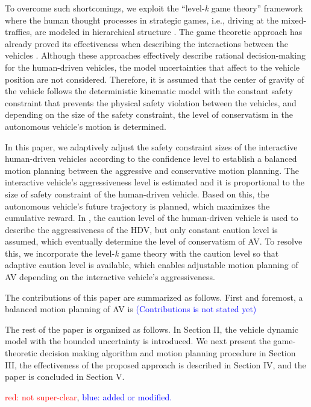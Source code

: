 \documentclass[10pt,journal]{IEEEtran}
\begin{document}
	To overcome such shortcomings, we exploit the ``level-\textit{k} game theory'' framework where the human thought processes in strategic games, i.e., driving at the mixed-traffics, are modeled in hierarchical structure \cite{Stahl1993}. The game theoretic approach has already proved its effectiveness when describing the interactions between the vehicles \cite{Li2017, Li2018, Tian2018}. Although these approaches effectively describe rational decision-making for the human-driven vehicles, the model uncertainties that affect to the vehicle position are not considered. Therefore, it is assumed that the center of gravity of the vehicle follows the deterministic kinematic model with the constant safety constraint that prevents the physical safety violation between the vehicles, and depending on the size of the safety constraint, the level of conservatism in the autonomous vehicle's motion is determined. 
	
	In this paper, we adaptively adjust the safety constraint sizes of the interactive human-driven vehicles according to the confidence level to establish a balanced motion planning between the aggressive and conservative motion planning. The interactive vehicle's aggressiveness level is estimated and it is proportional to the size of safety constraint of the human-driven vehicle. Based on this, the autonomous vehicle's future trajectory is planned, which maximizes the cumulative reward. In \cite{Jin2019}, the caution level of the human-driven vehicle is used to describe the aggressiveness of the HDV, but only constant caution level is assumed, which eventually determine the level of conservatism of AV. To resolve this, we incorporate the level-\textit{k} game theory with the caution level so that adaptive caution level is available, which enables adjustable motion planning of AV depending on the interactive vehicle's aggressiveness.
	
	The contributions of this paper are summarized as follows. First and foremost, a balanced motion planning of AV is 
	\textcolor{blue}{(Contributions is not stated yet)}
	
	The rest of the paper is organized as follows. In Section II, the vehicle dynamic model with the bounded uncertainty is introduced. We next present the game-theoretic decision making algorithm and motion planning procedure in Section III, the effectiveness of the proposed approach is described in Section IV, and the paper is concluded in Section V.
	
	\textcolor{red}{red: not super-clear}, \textcolor{blue}{blue: added or modified.}
	\label{sec:intro}
	
\end{document}
